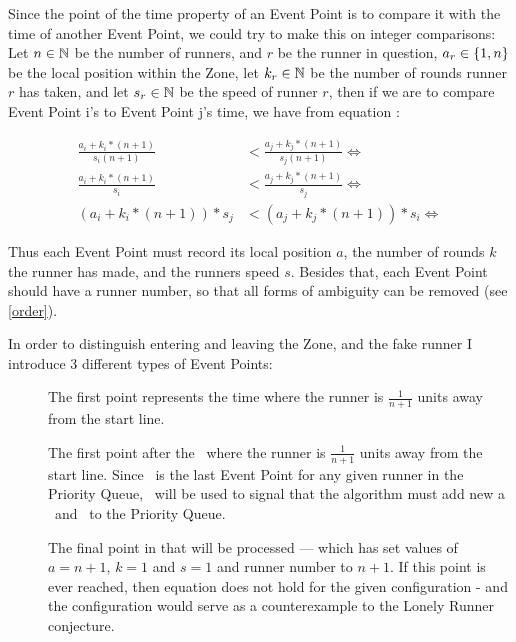 Since the point of the time property of an Event Point is to compare it with the time of another Event Point, we could try to make this on integer comparisons: Let $n \in \mathbb{N}$ be the number of runners, and $r$ be the runner in question, $a_r \in \{1, n\}$ be the local position within the Zone, let $k_r \in \mathbb{N}$ be the number of rounds runner $r$ has taken, and let $s_r \in \mathbb{N}$ be the speed of runner $r$, then if we are to compare Event Point i's to Event Point j's time, we have from equation :
  
\begin{equation}
\label{eqa:integerTime}
\begin{split}
\frac{a_i + k_i * (n+1)}{s_i (n+1)} &< \frac{a_j + k_j * (n+1)}{s_j (n+1)} \Leftrightarrow\\
\frac{a_i + k_i * (n+1)}{s_i} &< \frac{a_j + k_j * (n+1)}{s_j} \Leftrightarrow\\
(a_i + k_i * (n+1)) * s_j &< (a_j + k_j * (n+1)) * s_i \Leftrightarrow
\end{split}
\end{equation}

Thus each Event Point must record its local position $a$, the number of rounds $k$ the runner has made, and the runners speed $s$. Besides that, each Event Point should have a runner number, so that all forms of ambiguity can be removed (see \ref{order}).

In order to distinguish entering and leaving the Zone, and the fake runner I introduce 3 different types of Event Points:
\begin{description}
\item[\comStart] The first point represents the time where the runner is $\frac{1}{n + 1}$ units away from the start line.
\item[\comEnd] The first point after the \comStart\, where the runner is $\frac{1}{n + 1}$ units away from the start line. Since \comEnd\, is the last Event Point for any given runner in the Priority Queue, \comEnd\, will be used to signal that the algorithm must add new a \comStart\, and \comEnd\ to the Priority Queue.
\item[\comFin] The final point in that will be processed --- which has set values of $a = n+1$, $k = 1$ and $s = 1$ and runner number to $n+1$. If this point is ever reached, then equation  does not hold for the given configuration - and the configuration would serve as a counterexample to the Lonely Runner conjecture.
\end{description}

